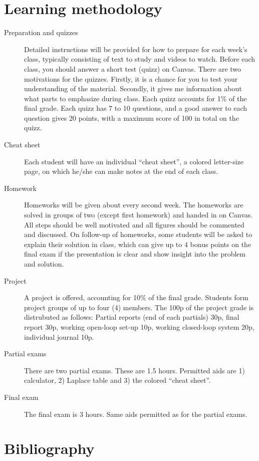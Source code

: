 \documentclass[letter, 10pt]{scrartcl}
\begin{document}
\section*{Learning methodology}
\begin{description}
\item[Preparation and quizzes] Detailed instructions will be provided for how to prepare for each week's class, typically consisting of text to study and videos to watch. Before each class, you should answer a short test (quizz) on Canvas. There are two motivations for the quizzes. Firstly, it is a chance for you to test your understanding of the material. Secondly, it gives me information about what parts to emphasize during class. Each quizz accounts for 1\% of the final grade. Each quizz has 7 to 10 questions, and a good answer to each question gives 20 points, with a maximum score of 100 in total on the quizz.  
\item[Cheat sheet] Each student will have an individual ``cheat sheet'', a colored letter-size page, on which he/she can make notes at the end of each class.
\item[Homework] Homeworks will be given about every second week. The homeworks are solved in groups of two (except first homework) and handed in on Canvas. All steps should be well motivated and all figures should be commented and discussed. On follow-up of homeworks, some students will be asked to explain their solution in class, which can give up to 4 bonus points on the final exam if the presentation is clear and show insight into the problem and solution.
\item[Project] A project is offered, accounting for 10\% of the final grade. Students form project groups of up to four (4) members. The 100p of the project grade is distrubuted as follows: Partial reports (end of each partials) 30p, final report 30p, working open-loop set-up 10p, working closed-loop system 20p, individual journal 10p.  
\item[Partial exams] There are two partial exams. These are 1.5 hours. Permitted aids are 1) calculator, 2) Laplace table and 3) the colored ``cheat sheet''.
\item[Final exam] The final exam is 3 hours. Same aids permitted as for the partial exams.
\end{description}

\section*{Bibliography}
\end{document}

